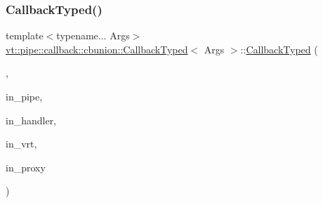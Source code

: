 \mbox{\label{structvt_1_1pipe_1_1callback_1_1cbunion_1_1_callback_typed_a53449646d77256c5ecb4deba498cac60}} 
\subsubsection{\texorpdfstring{Callback\+Typed()}{CallbackTyped()}\hspace{0.1cm}{\footnotesize\ttfamily [9/12]}}
{\footnotesize\ttfamily template$<$typename... Args$>$ \\
\hyperlink{structvt_1_1pipe_1_1callback_1_1cbunion_1_1_callback_typed}{vt\+::pipe\+::callback\+::cbunion\+::\+Callback\+Typed}$<$ Args $>$\+::\hyperlink{structvt_1_1pipe_1_1callback_1_1cbunion_1_1_callback_typed}{Callback\+Typed} (\begin{DoxyParamCaption}\item[{Raw\+Bcast\+Col\+Dir\+Tag\+Type}]{,  }\item[{\hyperlink{namespacevt_ac9852acda74d1896f48f406cd72c7bd3}{Pipe\+Type} const \&}]{in\+\_\+pipe,  }\item[{\hyperlink{namespacevt_af64846b57dfcaf104da3ef6967917573}{Handler\+Type} const}]{in\+\_\+handler,  }\item[{\hyperlink{structvt_1_1pipe_1_1callback_1_1cbunion_1_1_callback_raw_base_single_a734a9c83099de5bc1cd85f9da8dba7bb}{Auto\+Handler\+Type} const}]{in\+\_\+vrt,  }\item[{\hyperlink{namespacevt_a1b417dd5d684f045bb58a0ede70045ac}{Virtual\+Proxy\+Type} const \&}]{in\+\_\+proxy }\end{DoxyParamCaption})\hspace{0.3cm}{\ttfamily [inline]}}

\mbox{\label{structvt_1_1pipe_1_1callback_1_1cbunion_1_1_callback_typed_a1794176a2bb6afd876b78a0ecd09dd12}} 
